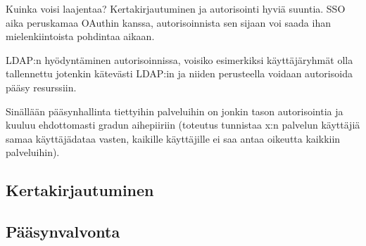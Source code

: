 Kuinka voisi laajentaa? Kertakirjautuminen ja autorisointi hyviä suuntia. SSO aika peruskamaa OAuthin kanssa, autorisoinnista sen sijaan voi saada ihan mielenkiintoista pohdintaa aikaan.

LDAP:n hyödyntäminen autorisoinnissa, voisiko esimerkiksi käyttäjäryhmät olla tallennettu jotenkin kätevästi LDAP:in ja niiden perusteella voidaan autorisoida pääsy resurssiin.

Sinällään pääsynhallinta tiettyihin palveluihin on jonkin tason autorisointia ja kuuluu ehdottomasti gradun aihepiiriin (toteutus tunnistaa x:n palvelun käyttäjiä samaa käyttäjädataa vasten, kaikille käyttäjille ei saa antaa oikeutta kaikkiin palveluihin).


\subsection{Kertakirjautuminen}

\subsection{Pääsynvalvonta}
